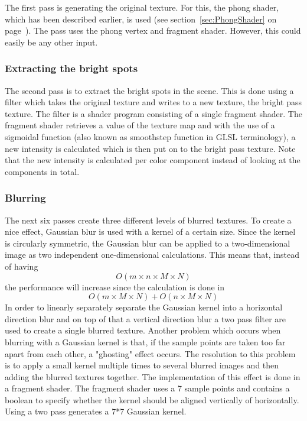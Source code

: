 \documentclass[a4paper,12pt]{article}
\begin{document}
The first pass is generating the original texture. For this, the phong shader, which has been described earlier, is used (see section~\ref{sec:PhongShader} on page~\pageref{sec:PhongShader}). The pass uses the phong vertex and fragment shader. However, this could easily be any other input.

\subsubsection{Extracting the bright spots}
\label{sec:ExtractingTheBrightSpots}
The second pass is to extract the bright spots in the scene. This is done using a filter which takes the original texture and writes to a new texture, the bright pass texture. The filter is a shader program consisting of a single fragment shader. The fragment shader retrieves a value of the texture map and with the use of a sigmoidal function (also known as smoothstep function in GLSL terminology), a new intensity is calculated which is then put on to the bright pass texture. Note that the new intensity is calculated per color component instead of looking at the components in total.

\subsubsection{Blurring}
\label{sec:Blurring}
The next six passes create three different levels of blurred textures. To create a nice effect, Gaussian blur is used with a kernel of a certain size. Since the kernel is circularly symmetric, the Gaussian blur can be applied to a two-dimensional image as two independent one-dimensional calculations. This means that, instead of having \[O(m \times n \times M \times N)\] the performance will increase since the calculation is done in \[ O(m \times M \times N) + O(n \times M \times N) \] In order to linearly separately separate the Gaussian kernel into a horizontal direction blur and on top of that a vertical direction blur a two pass filter are used to create a single blurred texture.
Another problem which occurs when blurring with a Gaussian kernel is that, if the sample points are taken too far apart from each other, a "ghosting" effect occurs. The resolution to this problem is to apply a small kernel multiple times to several blurred images and then adding the blurred textures together. The implementation of this effect is done in a fragment shader. The fragment shader uses a 7 sample points and contains a boolean to specify whether the kernel should be aligned vertically of horizontally. Using a two pass generates a 7*7 Gaussian kernel.
\end{document}
